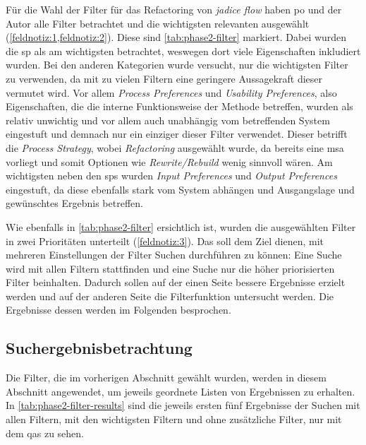 Für die Wahl der Filter für das Refactoring von \emph{jadice flow} haben \gls{po} und der Autor alle Filter betrachtet und die wichtigsten relevanten ausgewählt (\cref{feldnotiz:1,feldnotiz:2}).
Diese sind \cref{tab:phase2-filter} markiert.
Dabei wurden die \gls{sp} als am wichtigsten betrachtet, weswegen dort viele Eigenschaften inkludiert wurden.
Bei den anderen Kategorien wurde versucht, nur die wichtigsten Filter zu verwenden, da mit zu vielen Filtern eine geringere Aussagekraft dieser vermutet wird.
Vor allem \emph{Process Preferences} und \emph{Usability Preferences}, also Eigenschaften, die die interne Funktionsweise der Methode betreffen, wurden als relativ unwichtig und vor allem auch unabhängig vom betreffenden System eingestuft und demnach nur ein einziger dieser Filter verwendet.
Dieser betrifft die \emph{Process Strategy}, wobei \emph{Refactoring} ausgewählt wurde, da bereits eine \gls{msa} vorliegt und somit Optionen wie \emph{Rewrite/Rebuild} wenig sinnvoll wären.
Am wichtigsten neben den \glspl{sp} wurden \emph{Input Preferences} und \emph{Output Preferences} eingestuft, da diese ebenfalls stark vom System abhängen und Ausgangslage und gewünschtes Ergebnis betreffen.

Wie ebenfalls in \cref{tab:phase2-filter} ersichtlich ist, wurden die ausgewählten Filter in zwei Prioritäten unterteilt (\cref{feldnotiz:3}).
Das soll dem Ziel dienen, mit mehreren Einstellungen der Filter Suchen durchführen zu können: 
Eine Suche wird mit allen Filtern stattfinden und eine Suche nur die höher priorisierten Filter beinhalten.
Dadurch sollen auf der einen Seite bessere Ergebnisse erzielt werden und auf der anderen Seite die Filterfunktion untersucht werden.
Die Ergebnisse dessen werden im Folgenden besprochen.

\subsection{Suchergebnisbetrachtung}
\label{sec:phase2-ergebnisdurchsicht}

Die Filter, die im vorherigen Abschnitt gewählt wurden, werden in diesem Abschnitt angewendet, um jeweils geordnete Listen von Ergebnissen zu erhalten.
In \cref{tab:phase2-filter-results} sind die jeweils ersten fünf Ergebnisse der Suchen mit allen Filtern, mit den wichtigsten Filtern und ohne zusätzliche Filter, nur mit dem \glspl{qa} zu sehen. 



